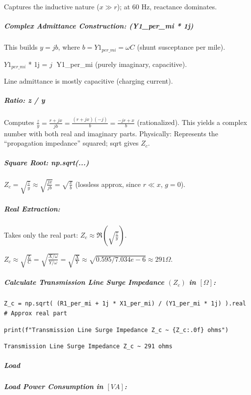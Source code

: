 Captures the inductive nature ($x \gg r$); at 60 Hz, reactance dominates.

\subparagraph{Complex Admittance Construction: (Y1\_per\_mi * 1j)}

This builds $y = j b$, where $b = Y1_{per\_mi} = \omega C$ (shunt susceptance per mile). \newline

$Y1_{per\_mi}$ * 1j = $j \;$ Y1\_per\_mi (purely imaginary, capacitive). \newline

Line admittance is mostly capacitive (charging current).

\subparagraph{Ratio: z / y}

Computes $\frac{z}{y} = \frac{r + j x}{j b} = \frac{(r + j x) ( -j)}{b} = \frac{ -j r + x }{b}$ (rationalized).
This yields a complex number with both real and imaginary parts.
Physically: Represents the ``propagation impedance'' squared; sqrt gives $Z_c$.

\subparagraph{Square Root: np.sqrt(...)}

$Z_c = \sqrt{\frac{z}{y}} \approx \sqrt{\frac{j x}{j b}} = \sqrt{\frac{x}{b}}$ (lossless approx, since $r \ll x$, $g = 0$).

\subparagraph{Real Extraction:}

Takes only the real part: $Z_c \approx \Re\left( \sqrt{\frac{z}{y}} \right)$. \newline

$Z_c \approx \sqrt{\frac{L}{C}} = \sqrt{\frac{X / \omega}{Y / \omega}} = \sqrt{\frac{X}{Y}} \approx \sqrt{0.595 / 7.034e -6} \approx 291 \Omega$.

\subparagraph{Calculate Transmission Line Surge Impedance $\left(Z_c\right)$ in $\left[\Omega\right]$:}

\begin{verbatim}
Z_c = np.sqrt( (R1_per_mi + 1j * X1_per_mi) / (Y1_per_mi * 1j) ).real  # Approx real part
\end{verbatim}

\begin{verbatim}
print(f"Transmission Line Surge Impedance Z_c ~ {Z_c:.0f} ohms")
\end{verbatim}

\begin{verbatim}
Transmission Line Surge Impedance Z_c ~ 291 ohms
\end{verbatim}

\subparagraph{Load}

\subparagraph{Load Power Consumption in $\left[VA\right]$:}

